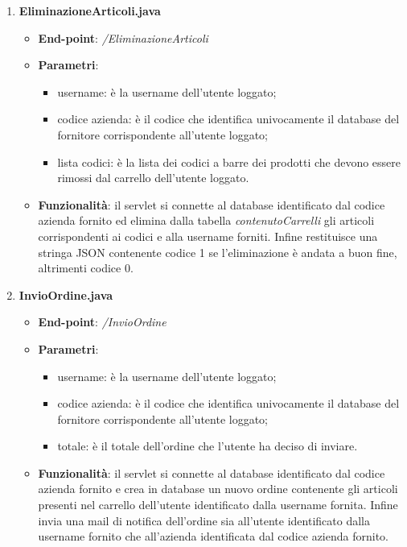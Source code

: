 \documentclass[12pt, a4paper, titlepage]{report}
\begin{document}
\begin{enumerate}
		\item \textbf{EliminazioneArticoli.java}
		\begin{itemize}
			\item \textbf{End-point}: \textit{/EliminazioneArticoli}
			\item \textbf{Parametri}:
			\begin{itemize}
				\item username: è la username dell'utente loggato;
				\item codice azienda: è il codice che identifica univocamente il database del fornitore corrispondente all'utente loggato;
				\item lista codici: è la lista dei codici a barre dei prodotti che devono essere rimossi dal carrello dell'utente loggato.
			\end{itemize}
			\item \textbf{Funzionalità}: il servlet si connette al database identificato dal codice azienda fornito ed elimina dalla tabella \textit{contenutoCarrelli} gli articoli corrispondenti ai codici e alla username forniti. Infine restituisce una stringa JSON contenente codice 1 se l'eliminazione è andata a buon fine, altrimenti codice 0.
		\end{itemize}
	
		\item \textbf{InvioOrdine.java}
		\begin{itemize}
			\item \textbf{End-point}: \textit{/InvioOrdine}
			\item \textbf{Parametri}:
			\begin{itemize}
				\item username: è la username dell'utente loggato;
				\item codice azienda: è il codice che identifica univocamente il database del fornitore corrispondente all'utente loggato;
				\item totale: è il totale dell'ordine che l'utente ha deciso di inviare.
			\end{itemize}
			\item \textbf{Funzionalità}: il servlet si connette al database identificato dal codice azienda fornito e crea in database un nuovo ordine contenente gli articoli presenti nel carrello dell'utente identificato dalla username fornita. Infine invia una mail di notifica dell'ordine sia all'utente identificato dalla username fornito che all'azienda identificata dal codice azienda fornito.
		\end{itemize}
	

\end{enumerate}
\end{document}
